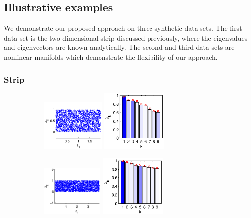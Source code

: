 \subsection{Illustrative examples} \label{sec:illustrative_examples}

We demonstrate our proposed approach on three synthetic data sets.
%
The first data set is the two-dimensional strip discussed previously, where the eigenvalues and eigenvectors are known analytically.
%
The second and third data sets are nonlinear manifolds which demonstrate the flexibility of our approach.

\subsubsection{Strip}

\begin{figure}[!t]
\centering
\begin{subfigure}{0.25\textwidth}
\includegraphics[height=2.5cm]{strip_data_L2}
\includegraphics[height=3cm]{strip_spectrum_L2}
\caption{}
\end{subfigure}
%
%
\begin{subfigure}{0.25\textwidth}
\includegraphics[height=2.5cm]{strip_data_L4}
\includegraphics[height=3cm]{strip_spectrum_L4}
\caption{}
\end{subfigure}

\end{figure}
